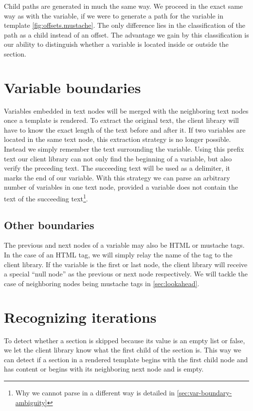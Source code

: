 \documentclass[thesis.tex]{subfiles}
\begin{document}
Child paths are generated in much the same way. We proceed in the exact same way
as with the  variable, if we were to generate a path
for the  variable in template \ref{fig:offsets.mustache}.
The only difference lies in the classification of the path as a child instead of
an offset.
The advantage we gain by this classification is our ability to distinguish
whether a variable is located inside or outside the section.

\section{Variable boundaries}
Variables embedded in text nodes will be merged with the neighboring text nodes
once a template is rendered. To extract the original text, the client library
will have to know the exact length of the text before and after it. If two
variables are located in the same text node, this extraction strategy is no
longer possible. Instead we simply remember the text surrounding the variable.
Using this prefix text our client library can not only find the beginning of a
variable, but also verify the preceding text. The succeeding text will be
used as a delimiter, it marks the end of our variable.
With this strategy we can parse an arbitrary number of variables in one text
node, provided a variable does not contain the text of the succeeding
text\footnote{Why we cannot parse in a different way is detailed in
\ref{sec:var-boundary-ambiguity}}.

\subsection{Other boundaries}
The previous and next nodes of a variable may also be HTML or mustache tags.
In the case of an HTML tag, we will simply relay the name of the tag to the
client library. If the variable is the first or last node, the client library
will receive a special ``null node'' as the previous or next node respectively.
We will tackle the case of neighboring nodes being mustache tags in
\ref{sec:lookahead}.

\section{Recognizing iterations}
To detect whether a section is skipped because its value is an empty
list or false, we let the client library know what the first child of the
section is.
This way we can detect if a section in a rendered template begins with the
first child node and has content or begins with its neighboring next node and is
empty.
\end{document}
